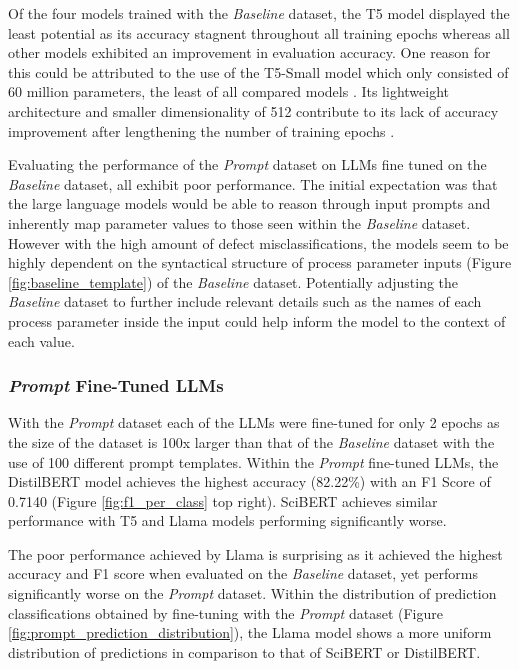 Of the four models trained with the \textit{Baseline} dataset, the T5 model
displayed the least potential as its accuracy stagnent throughout
all training epochs whereas all other models exhibited an improvement in
evaluation accuracy. One reason for this could be attributed to the use of the
T5-Small model which only consisted of 60 million parameters, the least of all
compared models \cite{raffel_exploring_2023}. Its lightweight architecture and
smaller dimensionality of 512 contribute to its lack of accuracy improvement
after lengthening the number of training epochs \cite{raffel_exploring_2023}.

Evaluating the performance of the \textit{Prompt} dataset on LLMs fine tuned on
the \textit{Baseline} dataset, all exhibit poor performance. The initial
expectation was that the large language models would be able to reason through
input prompts and inherently map parameter values to those seen within the
\textit{Baseline} dataset. However with the high amount of defect
misclassifications, the models seem to be highly dependent on the syntactical
structure of process parameter inputs (Figure \ref{fig:baseline_template}) of
the \textit{Baseline} dataset. Potentially adjusting the \textit{Baseline}
dataset to further include relevant details such as the names of each process parameter inside the
input could help inform the model to the context of each value.

\subsubsection{\textit{Prompt} Fine-Tuned LLMs}
With the \textit{Prompt} dataset each of the LLMs were fine-tuned for only 2
epochs as the size of the dataset is 100x larger than that of the
\textit{Baseline} dataset with the use of 100 different prompt templates. Within
the \textit{Prompt} fine-tuned LLMs, the DistilBERT model achieves the highest
accuracy (82.22\%) with an F1 Score of 0.7140 (Figure \ref{fig:f1_per_class} top right). SciBERT achieves similar
performance with T5 and Llama models performing significantly worse.

The poor performance achieved by Llama is surprising as it achieved the highest
accuracy and F1 score when evaluated on the \textit{Baseline} dataset, yet
performs significantly worse on the \textit{Prompt} dataset. Within the
distribution of prediction classifications obtained by fine-tuning with the
\textit{Prompt} dataset (Figure \ref{fig:prompt_prediction_distribution}), the
Llama model shows a more uniform distribution of predictions in comparison to
that of SciBERT or DistilBERT.

